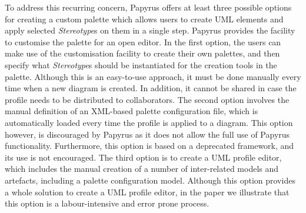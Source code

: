To address this recurring concern, Papyrus offers at least three possible options for creating a custom palette which allows users to create UML elements and apply selected \textit{Stereotype}s on them in a single step. 
Papyrus provides the facility to customise the palette for an open editor. 
In the first option, the users can make use of the customisation facility to create their own palettes, and then specify what \textit{Stereotype}s should be instantiated for the creation tools in the palette.
Although this is an easy-to-use approach, it must be done manually every time when a new diagram is created.
In addition, it cannot be shared in case the profile needs to be distributed to collaborators. 
The second option involves the manual definition of an XML-based palette configuration file, which is automatically loaded every time the profile is applied to a diagram. 
This option however, is discouraged by Papyrus as it does not allow the full use of Papyrus functionality.
Furthermore, this option is based on a deprecated framework, and its use is not encouraged. 
The third option is to create a UML profile editor, which includes the manual creation of a number of inter-related models and artefacts, including a palette configuration model. 
Although this option provides a whole solution to create a UML profile editor, in the paper we illustrate that this option is a labour-intensive and error prone process.


